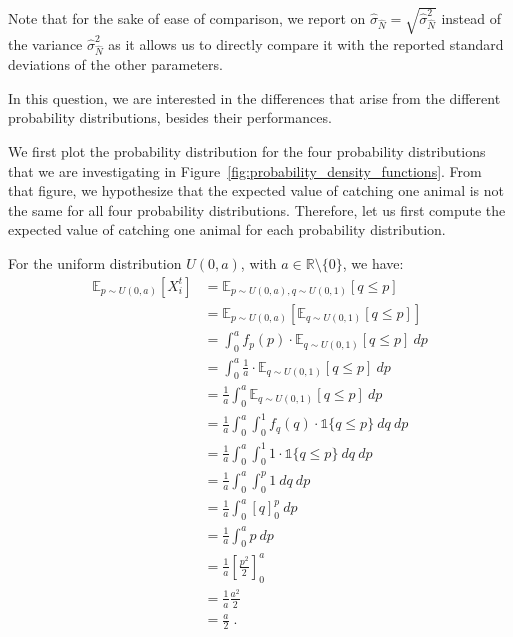 Note that for the sake of ease of comparison, we report on $\hat{\sigma}_{\hat{N}} = \sqrt{\hat{\sigma}_{\hat{N}}^2}$ instead of the variance $\hat{\sigma}_{\hat{N}}^2$ as it allows us to directly compare it with the reported standard deviations of the other parameters.


In this question, we are interested in the differences that arise from the different probability distributions, besides their performances. 

We first plot the probability distribution for the four probability distributions that we are investigating in Figure~\ref{fig:probability_density_functions}. From that figure, we hypothesize that the expected value of catching one animal is not the same for all four probability distributions. Therefore, let us first compute the expected value of catching one animal for each probability distribution. 

For the uniform distribution $U(0, a)$, with $a\in \mathbb{R}\setminus \{0\}$, we have:
\begin{align*}
    \mathbb{E}_{p \sim U(0, a)}[X_i^t] &= \mathbb{E}_{p \sim U(0, a), q\sim U(0, 1)}\left[ q \leq p \right] \\
    &= \mathbb{E}_{p \sim U(0, a)}\left[ \mathbb{E}_{q\sim U(0, 1)} \left[ q \leq p \right] \right] \\
    &= \int_0^a f_p(p) \cdot \mathbb{E}_{q\sim U(0, 1)} \left[ q \leq p \right] \  dp \\ 
    &= \int_0^a \frac{1}{a} \cdot \mathbb{E}_{q\sim U(0, 1)} \left[ q \leq p \right] \  dp \\ 
    &= \frac{1}{a} \int_0^a \mathbb{E}_{q\sim U(0, 1)} \left[ q \leq p \right] \  dp \\ 
    &= \frac{1}{a} \int_0^a \int_0^1 f_q(q) \cdot \mathbb{1}\{q \leq p\} \ dq \  dp \\
    &= \frac{1}{a} \int_0^a \int_0^1 1 \cdot \mathbb{1}\{q \leq p\} \ dq \  dp \\
    &= \frac{1}{a} \int_0^a \int_0^p 1 \ dq \  dp \\
    &= \frac{1}{a} \int_0^a {\left[ q \right]}_0^p \  dp \\
    &= \frac{1}{a} \int_0^a p \  dp \\
    &= \frac{1}{a} {\left[ \frac{p^2}{2} \right]}_0^a \\
    &= \frac{1}{a} \frac{a^2}{2} \\
    &= \frac{a}{2} \;.
\end{align*}

